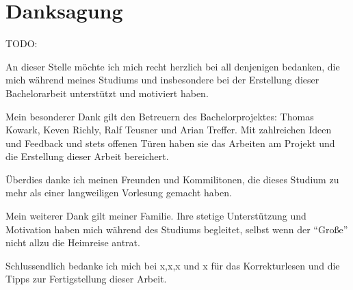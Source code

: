 \section*{Danksagung}
TODO:

An dieser Stelle möchte ich mich recht herzlich bei all denjenigen bedanken, die mich während meines Studiums und insbesondere bei der Erstellung dieser Bachelorarbeit unterstützt und motiviert haben. 

Mein besonderer Dank gilt den Betreuern des Bachelorprojektes: Thomas Kowark, Keven Richly, Ralf Teusner und Arian Treffer.
Mit zahlreichen Ideen und Feedback und stets offenen Türen haben sie das Arbeiten am Projekt und die Erstellung dieser Arbeit bereichert.

Überdies danke ich meinen Freunden und Kommilitonen, die dieses Studium zu mehr als einer langweiligen Vorlesung gemacht haben.

Mein weiterer Dank gilt meiner Familie. Ihre stetige Unterstützung und Motivation haben mich während des Studiums begleitet, selbst wenn der ``Große'' nicht allzu die Heimreise antrat.

Schlussendlich bedanke ich mich bei x,x,x und x für das Korrekturlesen und die Tipps zur Fertigstellung dieser Arbeit.
